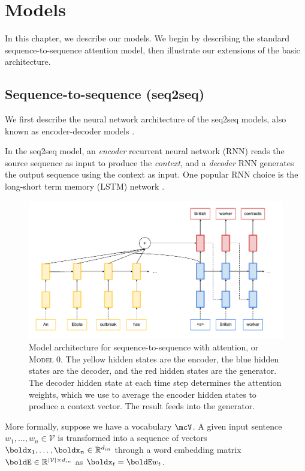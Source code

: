 \documentclass[12pt]{report}
\begin{document}
\chapter{Models}
\label{chap:models}

In this chapter, we describe our models. We begin by describing the standard sequence-to-sequence attention model, then illustrate our extensions of the basic architecture.

\section{Sequence-to-sequence (seq2seq)}

We first describe the neural network architecture of the seq2seq models, also known as encoder-decoder models \citep{bahdanau2014neural}.


In the seq2seq model, an \emph{encoder} recurrent neural network (RNN) reads the source sequence as input to produce the \emph{context}, and a \emph{decoder} RNN generates the output sequence using the context as input.  One popular RNN choice is the long-short term memory (LSTM) network \citep{hochreiter1997long}.

\begin{figure}[t]
\includegraphics[width=\textwidth]{images/seq2seq}
\caption[Sequence-to-Sequence Model]{Model architecture for sequence-to-sequence with attention, or \textsc{Model 0}. The yellow hidden states are the encoder, the blue hidden states are the decoder, and the red hidden states are the generator. The decoder hidden state at each time step determines the attention weights, which we use to average the encoder hidden states to produce a context vector. The result feeds into the generator.}
\label{fig:seq2seq}
\end{figure}


More formally, suppose we have a vocabulary $\mcV$. A given input sentence $w_1, \ldots, w_n \in \mathcal{V}$ is transformed into a sequence of vectors $\boldx_1, \ldots, \boldx_n \in \mathbb{R}^{d_{in}}$ through a word embedding matrix $\boldE \in \mathbb{R}^{|\mathcal{V}| \times d_{in}}$ as $\boldx_t = \boldE w_t$.
\end{document}
